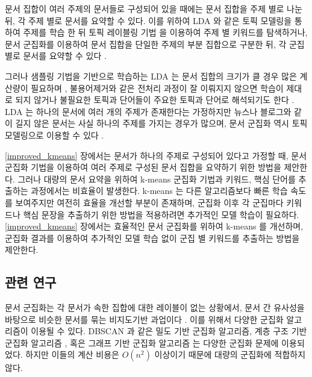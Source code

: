 \documentclass[11pt]{article}
\begin{document}
문서 집합이 여러 주제의 문서들로 구성되어 있을 때에는 문서 집합을 주제 별로 나눈 뒤, 각 주제 별로 문서를 요약할 수 있다.
이를 위하여 LDA \citep{blei2003latent} 와 같은 토픽 모델링을 통하여 주제를 학습 한 뒤 토픽 레이블링 기법 \citep{sievert2014ldavis} 을 이용하여 주제 별 키워드를 탐색하거나, 문서 군집화를 이용하여 문서 집합을 단일한 주제의 부분 집합으로 구분한 뒤, 각 군집별로 문서를 요약할 수 있다 \citep{wan2008multi, erkan2004lexpagerank, twinandilla2018multi}.

그러나 샘플링 기법을 기반으로 학습하는 LDA 는 문서 집합의 크기가 클 경우 많은 계산량이 필요하며 \citep{yuan2015lightlda}, 불용어제거와 같은 전처리 과정이 잘 이뤄지지 않으면 학습이 제대로 되지 않거나 불필요한 토픽과 단어들이 주요한 토픽과 단어로 해석되기도 한다 \citep{darling2011theoretical, newman2010evaluating}.
LDA 는 하나의 문서에 여러 개의 주제가 존재한다는 가정하지만 뉴스나 블로그와 같이 길지 않은 문서는 사실 하나의 주제를 가지는 경우가 많으며, 문서 군집화 역시 토픽 모델링으로 이용할 수 있다 \citep{dhillon2001concept, xu2003document, xie2013integrating}.

\ref{improved_kmeans} 장에서는 문서가 하나의 주제로 구성되어 있다고 가정할 때, 문서 군집화 기법을 이용하여 여러 주제로 구성된 문서 집합을 요약하기 위한 방법을 제안한다.
그러나 대량의 문서 요약을 위하여 k-means 군집화 기법과 키워드, 핵심 단어를 추출하는 과정에서는 비효율이 발생한다.
k-means 는 다른 알고리즘보다 빠른 학습 속도를 보여주지만 여전히 효율을 개선할 부분이 존재하며, 군집화 이후 각 군집마다 키워드나 핵심 문장을 추출하기 위한 방법을 적용하려면 추가적인 모델 학습이 필요하다.
\ref{improved_kmeans} 장에서는 효율적인 문서 군집화를 위하여 k-means 를 개선하며, 군집화 결과를 이용하여 추가적인 모델 학습 없이 군집 별 키워드를 추출하는 방법을 제안한다.

\subsection{관련 연구}

문서 군집화는 각 문서가 속한 집합에 대한 레이블이 없는 상황에서, 문서 간 유사성을 바탕으로 비슷한 문서를 묶는 비지도기반 과업이다 \citep{xu2015comprehensive, yang2017towards, xie2016unsupervised}.
이를 위해서 다양한 군집화 알고리즘이 이용될 수 있다.
DBSCAN \citep{ester1996density}과 같은 밀도 기반 군집화 알고리즘, 계층 구조 기반 군집화 알고리즘 \citep{sibson1973slink}, 혹은 그래프 기반 군집화 알고리즘 \citep{clauset2004finding} 는 다양한 군집화 문제에 이용되었다.
하지만 이들의 계산 비용은 $O(n^2)$ 이상이기 때문에 대량의 군집화에 적합하지 않다.
\end{document}

